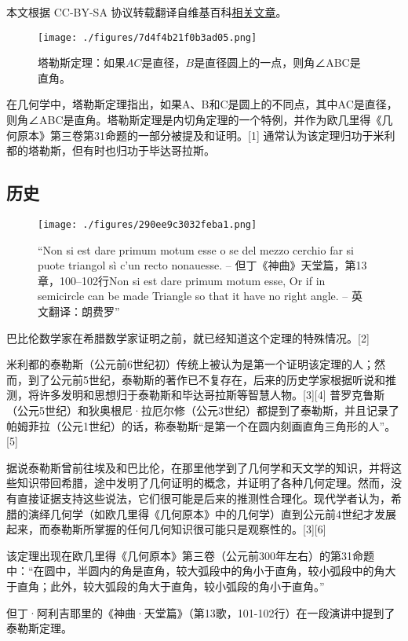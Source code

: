 
本文根据 CC-BY-SA 协议转载翻译自维基百科\href{https://en.wikipedia.org/wiki/Thales\%27s_theorem}{相关文章}。

\begin{figure}[ht]
\centering
\texttt{[image: ./figures/7d4f4b21f0b3ad05.png]}
\caption{塔勒斯定理：如果\(AC\)是直径，\(B\)是直径圆上的一点，则角∠ABC是直角。} \label{fig_Thales_1}
\end{figure}
在几何学中，塔勒斯定理指出，如果A、B和C是圆上的不同点，其中AC是直径，则角∠ABC是直角。塔勒斯定理是内切角定理的一个特例，并作为欧几里得《几何原本》第三卷第31命题的一部分被提及和证明。[1] 通常认为该定理归功于米利都的塔勒斯，但有时也归功于毕达哥拉斯。
\subsection{历史}
\begin{figure}[ht]
\centering
\texttt{[image: ./figures/290ee9c3032feba1.png]}
\caption{“Non si est dare primum motum esse o se del mezzo cerchio far si puote triangol sì c'un recto nonauesse. – 但丁《神曲》天堂篇，第13章，100–102行Non si est dare primum motum esse, Or if in semicircle can be made Triangle so that it have no right angle. – 英文翻译：朗费罗”} \label{fig_Thales_2}
\end{figure}
巴比伦数学家在希腊数学家证明之前，就已经知道这个定理的特殊情况。[2]

米利都的泰勒斯（公元前6世纪初）传统上被认为是第一个证明该定理的人；然而，到了公元前5世纪，泰勒斯的著作已不复存在，后来的历史学家根据听说和推测，将许多发明和思想归于泰勒斯和毕达哥拉斯等智慧人物。[3][4] 普罗克鲁斯（公元5世纪）和狄奥根尼·拉厄尔修（公元3世纪）都提到了泰勒斯，并且记录了帕姆菲拉（公元1世纪）的话，称泰勒斯“是第一个在圆内刻画直角三角形的人”。[5]

据说泰勒斯曾前往埃及和巴比伦，在那里他学到了几何学和天文学的知识，并将这些知识带回希腊，途中发明了几何证明的概念，并证明了各种几何定理。然而，没有直接证据支持这些说法，它们很可能是后来的推测性合理化。现代学者认为，希腊的演绎几何学（如欧几里得《几何原本》中的几何学）直到公元前4世纪才发展起来，而泰勒斯所掌握的任何几何知识很可能只是观察性的。[3][6]

该定理出现在欧几里得《几何原本》第三卷（公元前300年左右）的第31命题中：“在圆中，半圆内的角是直角，较大弧段中的角小于直角，较小弧段中的角大于直角；此外，较大弧段的角大于直角，较小弧段的角小于直角。”

但丁·阿利吉耶里的《神曲·天堂篇》（第13歌，101-102行）在一段演讲中提到了泰勒斯定理。
